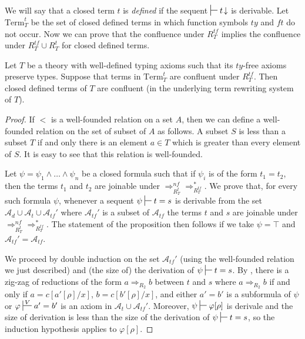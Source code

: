 \documentclass[reqno]{amsart}
\theoremstyle{definition}
\theoremstyle{remark}
\newcommand{\Term}{\mathrm{Term}}
\newcommand{\ft}{\mathit{ft}}
\newcommand{\ty}{\mathit{ty}}
\numberwithin{figure}{section}
\begin{document}
We will say that a closed term $t$ is \emph{defined} if the sequent $\sststile{}{} t\!\downarrow$ is derivable.
Let $\Term_T^t$ be the set of closed defined terms in which function symbols $\ty$ and $\ft$ do not occur.
Now we can prove that the confluence under $R^{tf}_T$ implies the confluence under $R^{tf}_T \cup R^t_T$ for closed defined terms.

\begin{prop}
Let $T$ be a theory with well-defined typing axioms such that its $\ty$-free axioms preserve types.
Suppose that terms in $\Term_T^t$ are confluent under $R^{tf}_T$.
Then closed defined terms of $T$ are confluent (in the underlying term rewriting system of $T$).
\end{prop}
\begin{proof}
If $<$ is a well-founded relation on a set $A$, then we can define a well-founded relation on the set of subset of $A$ as follows.
A subset $S$ is less than a subset $T$ if and only there is an element $a \in T$ which is greater than every element of $S$.
It is easy to see that this relation is well-founded.

Let $\psi = \psi_1 \land \ldots \land \psi_n$ be a closed formula such that if $\psi_i$ is of the form $t_1 = t_2$, then the terms $t_1$ and $t_2$ are joinable under $\Rightarrow_{R_T^t}^{nf} \Rightarrow_{R_T^{tf}}^*$.
We prove that, for every such formula $\psi$, whenever a sequent $\psi \sststile{}{} t = s$ is derivable from the set $\mathcal{A}_d \cup \mathcal{A}_t \cup \mathcal{A}_{tf}'$ where $\mathcal{A}_{tf}'$ is a subset of $\mathcal{A}_{tf}$
the terms $t$ and $s$ are joinable under $\Rightarrow_{R_T^t}^{nf} \Rightarrow_{R_T^{tf}}^*$.
The statement of the proposition then follows if we take $\psi = \top$ and $\mathcal{A}_{tf}' = \mathcal{A}_{tf}$.

We proceed by double induction on the set $\mathcal{A}_{tf}'$ (using the well-founded relation we just described) and (the size of) the derivation of $\psi \sststile{}{} t = s$.
By , there is a zig-zag of reductions of the form $a \Rightarrow_{R_2} b$ between $t$ and $s$ where $a \Rightarrow_{R_2} b$ if and only if $a = c[a'[\rho]/x]$, $b = c[b'[\rho]/x]$,
and either $a' = b'$ is a subformula of $\psi$ or $\varphi \sststile{}{V} a' = b'$ is an axiom in $\mathcal{A}_t \cup \mathcal{A}_{tf}'$.
Moreover, $\psi \sststile{}{} \varphi[\rho]$ is derivale and the size of derivation is less than the size of the derivation of $\psi \sststile{}{} t = s$, so the induction hypothesis applies to $\varphi[\rho]$.


\end{proof}
\end{document}
